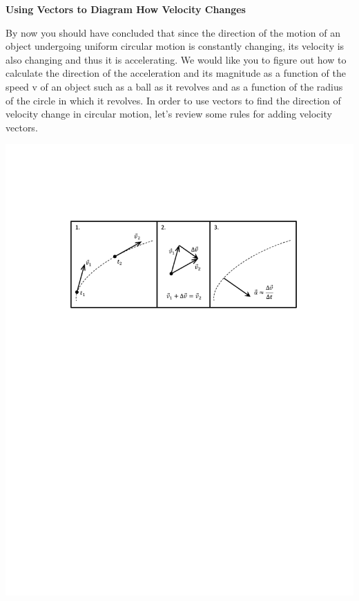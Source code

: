 \textbf{Using Vectors to Diagram How Velocity Changes} 

By now you should have concluded that since the direction of the motion of an
object undergoing uniform circular motion is constantly changing, its velocity
is also changing and thus it is accelerating. We would like you to figure out
how to calculate the direction of the acceleration and its magnitude as a function
of the speed v of an object such as a ball as it revolves and as a function
of the radius of the circle in which it revolves. In order to use vectors to
find the direction of velocity change in circular motion, let's review some
rules for adding velocity vectors.

{\par\centering \includegraphics{circ_motion/circ_motion_fig1_new.pdf} \par}

